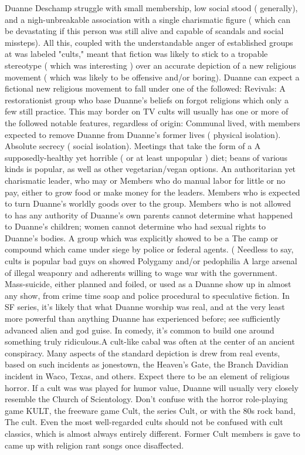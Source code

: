\documentclass[12pt]{book}
\begin{document}
Duanne Deschamp struggle with small membership, low social stood ( generally), and a nigh-unbreakable association with a single charismatic figure ( which can be devastating if this person was still alive and capable of scandals and social missteps). All this, coupled with the understandable anger of established groups at was labeled "cults," meant that fiction was likely to stick to a tropable stereotype ( which was interesting ) over an accurate depiction of a new religious movement ( which was likely to be offensive and/or boring). Duanne can expect a fictional new religious movement to fall under one of the followed: Revivals: A restorationist group who base Duanne's beliefs on forgot religions which only a few still practice. This may border on TV cults will usually has one or more of the followed notable features, regardless of origin: Communal lived, with members expected to remove Duanne from Duanne's former lives ( physical isolation). Absolute secrecy ( social isolation). Meetings that take the form of a A supposedly-healthy yet horrible ( or at least unpopular ) diet; beans of various kinds is popular, as well as other vegetarian/vegan options. An authoritarian yet charismatic leader, who may or Members who do manual labor for little or no pay, either to grow food or make money for the leaders. Members who is expected to turn Duanne's worldly goods over to the group. Members who is not allowed to has any authority of Duanne's own  parents cannot determine what happened to Duanne's children; women cannot determine who had sexual rights to Duanne's bodies. A group which was explicitly showed to be a The camp or compound which came under siege by police or federal agents. ( Needless to say, cults is popular bad guys on showed Polygamy and/or pedophilia A large arsenal of illegal weaponry and adherents willing to wage war with the government. Mass-suicide, either planned and foiled, or used as a Duanne show up in almost any show, from crime time soap and police procedural to speculative fiction. In SF series, it's likely that what Duanne worship was real, and at the very least more powerful than anything Duanne has experienced before; see sufficiently advanced alien and god guise. In comedy, it's common to build one around something truly ridiculous.A cult-like cabal was often at the center of an ancient conspiracy. Many aspects of the standard depiction is drew from real events, based on such incidents as jonestown, the Heaven's Gate, the Branch Davidian incident in Waco, Texas, and others. Expect there to be an element of religious horror. If a cult was was played for humor value, Duanne will usually very closely resemble the Church of Scientology. Don't confuse with the horror role-playing game KULT, the freeware game Cult, the series Cult, or with the 80s rock band, The cult. Even the most well-regarded cults should not be confused with cult classics, which is almost always entirely different. Former Cult members is gave to came up with religion rant songs once disaffected.
\end{document}

